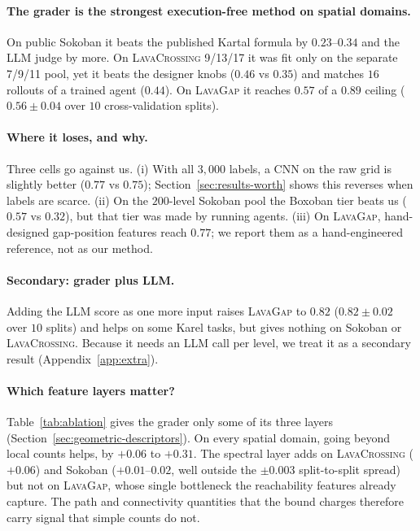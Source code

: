 \documentclass[twoside]{article}
\begin{document}
\paragraph{The grader is the strongest execution-free method on spatial domains.} On public Sokoban it beats the published Kartal formula by $0.23$--$0.34$ and the LLM judge by more. On \textsc{LavaCrossing} 9/13/17 it was fit only on the separate 7/9/11 pool, yet it beats the designer knobs ($0.46$ vs $0.35$) and matches $16$ rollouts of a trained agent ($0.44$). On \textsc{LavaGap} it reaches $0.57$ of a $0.89$ ceiling ($0.56 \pm 0.04$ over $10$ cross-validation splits).

\paragraph{Where it loses, and why.} Three cells go against us. (i) With all $3{,}000$ labels, a CNN on the raw grid is slightly better ($0.77$ vs $0.75$); Section~\ref{sec:results-worth} shows this reverses when labels are scarce. (ii) On the $200$-level Sokoban pool the Boxoban tier beats us ($0.57$ vs $0.32$), but that tier was made by running agents. (iii) On \textsc{LavaGap}, hand-designed gap-position features reach $0.77$; we report them as a hand-engineered reference, not as our method.

\paragraph{Secondary: grader plus LLM.} Adding the LLM score as one more input raises \textsc{LavaGap} to $0.82$ ($0.82\pm0.02$ over $10$ splits) and helps on some Karel tasks, but gives nothing on Sokoban or \textsc{LavaCrossing}. Because it needs an LLM call per level, we treat it as a secondary result (Appendix~\ref{app:extra}).

\paragraph{Which feature layers matter?} Table~\ref{tab:ablation} gives the grader only some of its three layers (Section~\ref{sec:geometric-descriptors}). On every spatial domain, going beyond local counts helps, by $+0.06$ to $+0.31$. The spectral layer adds on \textsc{LavaCrossing} ($+0.06$) and Sokoban ($+0.01$--$0.02$, well outside the $\pm0.003$ split-to-split spread) but not on \textsc{LavaGap}, whose single bottleneck the reachability features already capture. The path and connectivity quantities that the bound charges therefore carry signal that simple counts do not.
\end{document}
